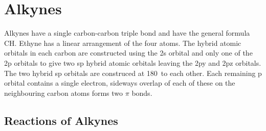 \section{Alkynes}


Alkynes have a single carbon-carbon triple bond and have the general formula
CH. Ethyne has a linear arrangement of the four atoms. The hybrid
atomic orbitals in each carbon are constructed using the 2s orbital and only one
of the 2p orbitals to give two sp hybrid atomic orbitals leaving the 2py and 2pz
orbitals. The two hybrid sp orbitals are construced at 180\de\ to each other.
Each remaining p orbital contains a single electron, sideways overlap of each of
these on the neighbouring carbon atoms forms two $\pi$ bonds.


\subsection{Reactions of Alkynes}

